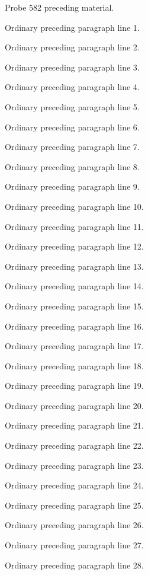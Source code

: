 \documentclass[11pt]{article}
\newcommand\LMcotename{}
\newcommand\LMcote[1]{\gdef\LMcotename{#1}}
\begin{document}
\LMcote{140-2}
\clearpage\noindent Probe 582 preceding material.\par
\noindent Ordinary preceding paragraph line 1.\par
\noindent Ordinary preceding paragraph line 2.\par
\noindent Ordinary preceding paragraph line 3.\par
\noindent Ordinary preceding paragraph line 4.\par
\noindent Ordinary preceding paragraph line 5.\par
\noindent Ordinary preceding paragraph line 6.\par
\noindent Ordinary preceding paragraph line 7.\par
\noindent Ordinary preceding paragraph line 8.\par
\noindent Ordinary preceding paragraph line 9.\par
\noindent Ordinary preceding paragraph line 10.\par
\noindent Ordinary preceding paragraph line 11.\par
\noindent Ordinary preceding paragraph line 12.\par
\noindent Ordinary preceding paragraph line 13.\par
\noindent Ordinary preceding paragraph line 14.\par
\noindent Ordinary preceding paragraph line 15.\par
\noindent Ordinary preceding paragraph line 16.\par
\noindent Ordinary preceding paragraph line 17.\par
\noindent Ordinary preceding paragraph line 18.\par
\noindent Ordinary preceding paragraph line 19.\par
\noindent Ordinary preceding paragraph line 20.\par
\noindent Ordinary preceding paragraph line 21.\par
\noindent Ordinary preceding paragraph line 22.\par
\noindent Ordinary preceding paragraph line 23.\par
\noindent Ordinary preceding paragraph line 24.\par
\noindent Ordinary preceding paragraph line 25.\par
\noindent Ordinary preceding paragraph line 26.\par
\noindent Ordinary preceding paragraph line 27.\par
\noindent Ordinary preceding paragraph line 28.\par
\end{document}
